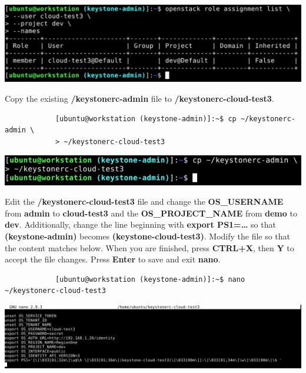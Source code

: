 \documentclass[letterpaper, 12pt]{article}
\begin{document}
\begin{enumerate}
\begin{labstep}
        \begin{center}
            \includegraphics[width=\linewidth]{images/part4/step10.png}
        \end{center}
    \end{labstep}

    \begin{labstep}
        Copy the existing \textbf{\texttildemid/keystonerc-admin} file to \textbf{\texttildemid/keystonerc-cloud-test3}.
        \begin{lstlisting}
            [ubuntu@workstation (keystone-admin)]:~$ cp ~/keystonerc-admin \
            > ~/keystonerc-cloud-test3
        \end{lstlisting}

        \begin{center}
            \includegraphics[width=\linewidth]{images/part4/step11.png}
        \end{center}
    \end{labstep}

    \begin{labstep}
        Edit the \textbf{\texttildemid/keystonerc-cloud-test3} file and change the \textbf{OS\_USERNAME} from \textbf{admin} to \textbf{cloud-test3} and the \textbf{OS\_PROJECT\_NAME} from \textbf{demo} to \textbf{dev}.
        Additionally, change the line beginning with \textbf{export PS1=…} so that \textbf{(keystone-admin)} becomes \textbf{(keystone-cloud-test3)}.
        Modify the file so that the content matches below.
        When you are finished, press \textbf{CTRL+X}, then \textbf{Y} to accept the file changes.
        Press \textbf{Enter} to save and exit \textbf{nano}.
        \begin{lstlisting}
            [ubuntu@workstation (keystone-admin)]:~$ nano ~/keystonerc-cloud-test3
        \end{lstlisting}

        \begin{center}
            \includegraphics[width=\linewidth]{images/part4/step12.png}
        \end{center}
    \end{labstep}


\end{enumerate}
\end{document}
